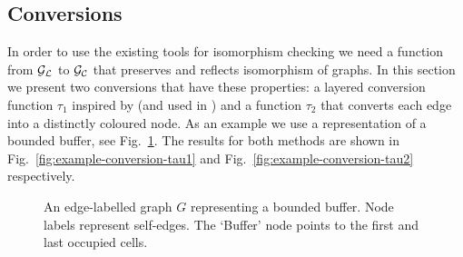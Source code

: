 \subsection{Conversions}
\label{section-conversion}

In order to use the existing tools for isomorphism checking we need a function
from $\mathcal{G_L}$ to $\mathcal{G_C}$ that preserves and reflects isomorphism of graphs. In this
section we present two conversions that have these properties: a layered
conversion function $\tau_1$ inspired by \cite{mckay2007:nug24} (and used in
\cite{spermann2008:prob}) and a function $\tau_2$ that converts each edge
into a distinctly coloured node. As an example we use a representation of a
bounded buffer, see Fig.~\ref{fig:example-conversion:edge-labelled}. The results
for both methods are shown in Fig.~\ref{fig:example-conversion-tau1} and
Fig.~\ref{fig:example-conversion-tau2} respectively.

\begin{figure}[tbp]
\centering
{}
\caption{An edge-labelled graph $G$ representing a bounded buffer. Node
labels represent self-edges. The  `Buffer' node points to the first and
last occupied cells.}
\label{fig:example-conversion:edge-labelled}
\end{figure}

